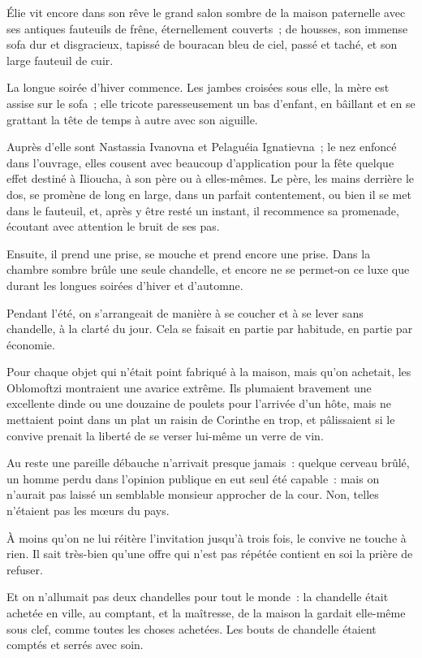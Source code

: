 \documentclass[french,twoside]{book} %
\begin{document}
\noindent Élie vit encore dans son rêve le grand salon sombre de la maison paternelle avec ses antiques fauteuils de frêne, éternellement couverts ; de housses, son immense sofa dur et disgracieux, tapissé de bouracan bleu de ciel, passé et taché, et son large fauteuil de cuir.\par
La longue soirée d’hiver commence. Les jambes croisées sous elle, la mère est assise sur le sofa ; elle tricote paresseusement un bas d’enfant, en bâillant et en se grattant la tête de temps à autre avec son aiguille.\par
Auprès d’elle sont Nastassia Ivanovna et Pelaguéia Ignatievna ; le nez enfoncé dans l’ouvrage, elles cousent avec beaucoup d’application pour la fête quelque effet destiné à Ilioucha, à son père ou à elles-mêmes. Le père, les mains derrière le dos, se promène de long en large, dans un parfait contentement, ou bien il se met dans le fauteuil, et, après y être resté un instant, il recommence sa promenade, écoutant avec attention le bruit de ses pas.\par
Ensuite, il prend une prise, se mouche et prend encore une prise. Dans la chambre sombre brûle une seule chandelle, et encore ne se permet-on ce luxe que durant les longues soirées d’hiver et d’automne.\par
Pendant l’été, on s’arrangeait de manière à se coucher et à se lever sans chandelle, à la clarté du jour. Cela se faisait en partie par habitude, en partie par économie.\par
Pour chaque objet qui n’était point fabriqué à la maison, mais qu’on achetait, les Oblomoftzi montraient une avarice extrême. Ils plumaient bravement une excellente dinde ou une douzaine de poulets pour l’arrivée d’un hôte, mais ne mettaient point dans un plat un raisin de Corinthe en trop, et pâlissaient si le convive prenait la liberté de se verser lui-même un verre de vin.\par
Au reste une pareille débauche n’arrivait presque jamais : quelque cerveau brûlé, un homme perdu dans l’opinion publique en eut seul été capable : mais on n’aurait pas laissé un semblable monsieur approcher de la cour. Non, telles n’étaient pas les mœurs du pays.\par
À moins qu’on ne lui réitère l’invitation jusqu’à trois fois, le convive ne touche à rien. Il sait très-bien qu’une offre qui n’est pas répétée contient en soi la prière de refuser.\par
Et on n’allumait pas deux chandelles pour tout le monde : la chandelle était achetée en ville, au comptant, et la maîtresse, de la maison la gardait elle-même sous clef, comme toutes les choses achetées. Les bouts de chandelle étaient comptés et serrés avec soin.\par
\end{document}
